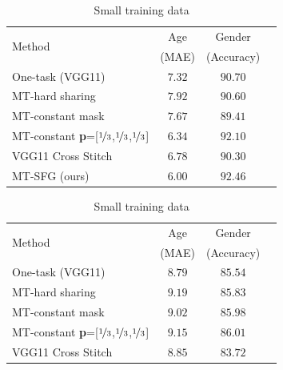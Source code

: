 \begin{table}[h]
    \begin{subtable}[t]{0.49\linewidth}
    \footnotesize
    \caption{Full training data}
    \vspace{-5mm}
    \begin{center}
        \begin{tabular}{lccc}
        \hline
            \toprule
            \multirow{2}{*}{Method}                      & Age   & Gender     \\
                                                        & (MAE)   & (Accuracy)    \\
            \midrule
            One-task (VGG11) \cite{vgg}                       & $7.32$  & $90.70$                 \\
            \multirow{1}{*}{MT-hard sharing}   & $7.92$  & $90.60$ \\ 
            \multirow{1}{*}{MT-constant mask}   & $7.67$  & $89.41$                 \\
            \multirow{1}{*}{MT-constant \textbf{p}=[$\nicefrac{1}{3}$,$\nicefrac{1}{3}$,$\nicefrac{1}{3}$]}   & \cellcolor{blue!15} $6.34$  & \cellcolor{blue!15} $92.10$                 \\
            \multirow{1}{*}{VGG11 Cross Stitch \cite{MisraCrossMTL16}}   & $6.78$  & $90.30$                 \\
            \multirow{1}{*}{MT-SFG (ours)}       &  \cellcolor{red!15} $\mathbf{6.00}$  &  \cellcolor{red!15} $\mathbf{92.46}$                 \\
        \hline
        \end{tabular}
    \end{center}
    \label{tab:big_data}
    \end{subtable}
    \begin{subtable}[t]{0.49\linewidth}
    \footnotesize
    \caption{Small training data}
    \vspace{-5mm}
    \begin{center}
        \begin{tabular}{lccc}
        \hline
            \toprule
            \multirow{2}{*}{Method} & Age   & Gender     \\
            & (MAE)   & (Accuracy)    \\
            \midrule
            One-task (VGG11) \cite{vgg}                       & \cellcolor{blue!15}  $8.79$  & $85.54$                 \\
            \multirow{1}{*}{MT-hard sharing}   & $9.19$  & $85.83$                 \\
            \multirow{1}{*}{MT-constant mask}   & $9.02$  & $85.98$                \\
            \multirow{1}{*}{MT-constant \textbf{p}=[$\nicefrac{1}{3}$,$\nicefrac{1}{3}$,$\nicefrac{1}{3}$]}   & $9.15$  & \cellcolor{blue!15} $86.01$                 \\
            \multirow{1}{*}{VGG11 Cross Stitch \cite{MisraCrossMTL16}}   & $8.85$  &   $83.72$                 \\
            

\end{tabular}
\end{center}
\end{subtable}
\end{table}
